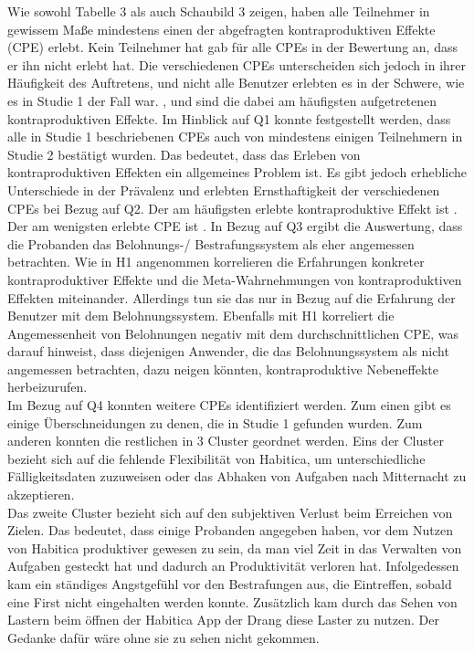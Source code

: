 \documentclass[sigconf, nonacm]{acmart}
\begin{document}
Wie sowohl Tabelle 3 als auch Schaubild 3 zeigen, haben alle Teilnehmer in gewissem Maße mindestens einen der abgefragten kontraproduktiven Effekte (CPE) erlebt. Kein Teilnehmer hat gab für alle CPEs in der Bewertung an, dass er ihn nicht erlebt hat. Die verschiedenen CPEs unterscheiden sich jedoch in ihrer Häufigkeit des Auftretens, und nicht alle Benutzer erlebten es in der Schwere, wie es in Studie 1 der Fall war. ,  und  sind die dabei am häufigsten aufgetretenen kontraproduktiven Effekte. 
Im Hinblick auf Q1 konnte festgestellt werden, dass alle in Studie 1 beschriebenen CPEs auch von mindestens einigen Teilnehmern in Studie 2 bestätigt wurden. Das bedeutet, dass das Erleben von kontraproduktiven Effekten ein allgemeines Problem ist. Es gibt jedoch erhebliche Unterschiede in der Prävalenz und erlebten Ernsthaftigkeit der verschiedenen CPEs bei Bezug auf Q2. Der am häufigsten erlebte kontraproduktive Effekt ist . Der am wenigsten erlebte CPE ist . In Bezug auf Q3 ergibt die Auswertung, dass die Probanden das Belohnungs-/ Bestrafungssystem als eher angemessen betrachten. 
Wie in H1 angenommen korrelieren die Erfahrungen konkreter kontraproduktiver Effekte und die Meta-Wahrnehmungen von kontraproduktiven Effekten miteinander. Allerdings tun sie das nur in Bezug auf die Erfahrung der Benutzer mit dem Belohnungssystem. Ebenfalls mit H1 korreliert die Angemessenheit von Belohnungen negativ mit dem durchschnittlichen CPE, was darauf hinweist, dass diejenigen Anwender, die das Belohnungssystem als nicht angemessen betrachten, dazu neigen könnten, kontraproduktive Nebeneffekte herbeizurufen. 
\\
Im Bezug auf Q4 konnten weitere CPEs identifiziert werden. Zum einen gibt es einige Überschneidungen zu denen, die in Studie 1 gefunden wurden. Zum anderen konnten die restlichen in 3 Cluster geordnet werden. 
Eins der Cluster bezieht sich auf die fehlende Flexibilität von Habitica, um unterschiedliche Fälligkeitsdaten zuzuweisen oder das Abhaken von Aufgaben nach Mitternacht zu akzeptieren. 
\\
Das zweite Cluster bezieht sich auf den subjektiven Verlust beim Erreichen von Zielen. Das bedeutet, dass einige Probanden angegeben haben, vor dem Nutzen von Habitica produktiver gewesen zu sein, da man viel Zeit in das Verwalten von Aufgaben gesteckt hat und dadurch an Produktivität verloren hat. Infolgedessen kam ein ständiges Angstgefühl vor den Bestrafungen aus, die Eintreffen, sobald eine First nicht eingehalten werden konnte. Zusätzlich kam durch das Sehen von Lastern beim öffnen der Habitica App der Drang diese Laster zu nutzen. Der Gedanke dafür wäre ohne sie zu sehen nicht gekommen.
\end{document}
